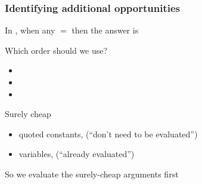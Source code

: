 \begin{frame}
\frametitle{Identifying additional opportunities}

In , when any  $=$ 
then the answer is 

\SmallSkip

Which order should we use?
\begin{itemize}
\item {}
\item {}
\item {}
\end{itemize}

\SmallSkip
Surely cheap
\begin{itemize}
\item quoted constants, (``don't need to be evaluated'')
\item variables, (``already evaluated'')
\end{itemize}

\SmallSkip 
So we evaluate the surely-cheap arguments first
\end{frame}

